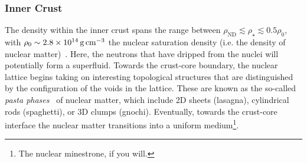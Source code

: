 \subsubsection*{Inner Crust}
The density within the inner crust spans the range between $\rho_\mathrm{ND}\lesssim \rho_\star \lesssim 0.5\rho_0$, with $\rho_0 \sim 2.8\times 10^{14}{\rm \,g}{\rm \,cm}^{-3}$ the nuclear saturation density (i.e. the density of nuclear matter)~\cite{Lattimer:2004pg_Physicsneutronstars,Haensel_NeutronstarsEqation,Grill:2014aea_Equationstatethickness}. Here, the neutrons that have dripped from the nuclei will potentially form a superfluid. Towards the crust-core boundary, the nuclear lattice begins taking on interesting topological structures that are distinguished by the configuration of the voids in the lattice. These are known as the so-called \textit{pasta phases}~\cite{Watanabe:2004tr_SimulationtransitionsPasta,Avancini:2010ch_Warmpastaphase,Yakovlev:2015vma_Electrontransportnuclear} of nuclear matter, which include 2D sheets (lasagna), cylindrical rods (spaghetti), or 3D clumps (gnochi).
Eventually, towards the crust-core interface the nuclear matter transitions into a uniform medium\footnote{The nuclear minestrone, if you will.}. 

